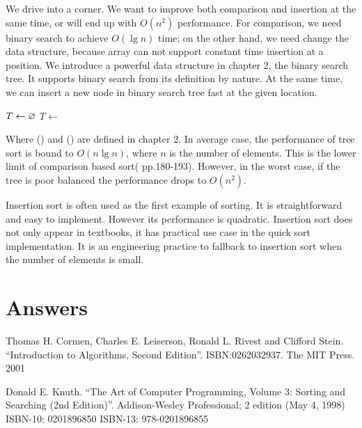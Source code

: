 \documentclass[b5paper]{article}
\begin{document}
We drive into a corner. We want to improve both comparison and insertion at the same time, or will end up with $O(n^2)$ performance. For comparison, we need binary search to achieve $O(\lg n)$ time; on the other hand, we need change the data structure, because array can not support constant time insertion at a position. We introduce a powerful data structure in chapter 2, the binary search tree. It supports binary search from its definition by nature. At the same time, we can insert a new node in binary search tree fast at the given location.

\begin{algorithmic}[1]
  \State $T \gets \varnothing$
    \State $T \gets $ 
  \EndFor
  \State \Return {}
\EndFunction
\end{algorithmic}

Where () and () are defined in chapter 2. In average case, the performance of tree sort is bound to $O(n \lg n)$, where $n$ is the number of elements. This is the lower limit of comparison based sort(\cite{Knuth} pp.180-193). However, in the worst case, if the tree is poor balanced the performance drops to $O(n^2)$.

Insertion sort is often used as the first example of sorting. It is straightforward and easy to implement. However its performance is quadratic. Insertion sort does not only appear in textbooks, it has practical use case in the quick sort implementation. It is an engineering practice to fallback to insertion sort when the number of elements is small.

\ifx\wholebook\relax \else
\section{Answers}
\shipoutAnswer

\begin{thebibliography}{99}

Thomas H. Cormen, Charles E. Leiserson, Ronald L. Rivest and Clifford Stein.
``Introduction to Algorithms, Second Edition''. ISBN:0262032937. The MIT Press. 2001

Donald E. Knuth. ``The Art of Computer Programming, Volume 3: Sorting and Searching (2nd Edition)''. Addison-Wesley Professional; 2 edition (May 4, 1998) ISBN-10: 0201896850 ISBN-13: 978-0201896855

\end{thebibliography}
\end{document}
